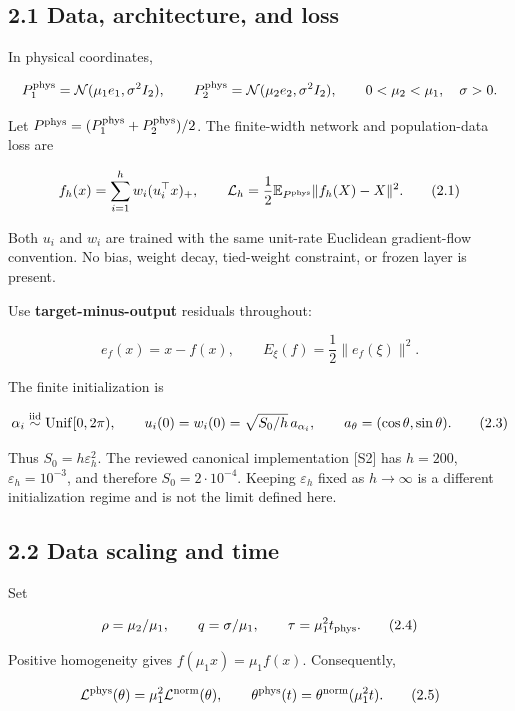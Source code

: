 \documentclass[
  10pt,
]{article}
\begin{document}
\subsection{2.1 Data, architecture, and
loss}\label{data-architecture-and-loss}

In physical coordinates,

\[
 P_1^{\rm phys}=\mathcal N(\mu_1e_1,\sigma^2I_2),\qquad
 P_2^{\rm phys}=\mathcal N(\mu_2e_2,\sigma^2I_2),\qquad
 0<\mu_2<\mu_1,\quad\sigma>0.
\]

Let \(P^{\rm phys}=(P_1^{\rm phys}+P_2^{\rm phys})/2\). The finite-width
network and population-data loss are

\[
 f_h(x)=\sum_{i=1}^h w_i(u_i^\top x)_+,
 \qquad
 \mathcal L_h=\frac12\mathbb E_{P^{\rm phys}}\|f_h(X)-X\|^2.
 \tag{2.1}
\]

Both \(u_i\) and \(w_i\) are trained with the same unit-rate Euclidean
gradient-flow convention. No bias, weight decay, tied-weight constraint,
or frozen layer is present.

Use \textbf{target-minus-output} residuals throughout:

\[
 e_f(x)=x-f(x),\qquad E_\xi(f)=\frac12\|e_f(\xi)\|^2.
 \tag{2.2}
\]

The finite initialization is

\[
 \alpha_i\overset{\rm iid}{\sim}{\rm Unif}[0,2\pi),\qquad
 u_i(0)=w_i(0)=\sqrt{S_0/h}\,a_{\alpha_i},\qquad
 a_\theta=(\cos\theta,\sin\theta).
 \tag{2.3}
\]

Thus \(S_0=h\varepsilon_h^2\). The reviewed canonical implementation
{[}S2{]} has \(h=200\), \(\varepsilon_h=10^{-3}\), and therefore
\(S_0=2\cdot10^{-4}\). Keeping \(\varepsilon_h\) fixed as \(h\to\infty\)
is a different initialization regime and is not the limit defined here.

\subsection{2.2 Data scaling and time}\label{data-scaling-and-time}

Set

\[
 \rho=\mu_2/\mu_1,\qquad q=\sigma/\mu_1,\qquad
 \tau=\mu_1^2t_{\rm phys}.
 \tag{2.4}
\]

Positive homogeneity gives \(f(\mu_1x)=\mu_1 f(x)\). Consequently,

\[
 \mathcal L^{\rm phys}(\theta)=\mu_1^2\mathcal L^{\rm norm}(\theta),
 \qquad \theta^{\rm phys}(t)=\theta^{\rm norm}(\mu_1^2t).
 \tag{2.5}
\]
\end{document}
